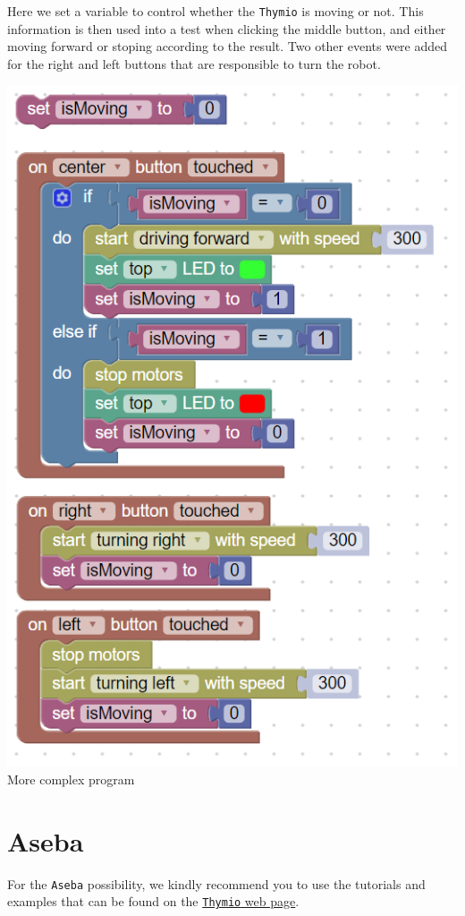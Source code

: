 \documentclass{scrreprt}
\begin{document}
Here we set a variable to control whether the \texttt{Thymio} is moving or not. This information is then used into a test when clicking the middle button, and either moving forward or stoping according to the result.
Two other events were added for the right and left buttons that are responsible to turn the robot.
\begin{center}
  \includegraphics[scale=0.5]{./Blockly/advanced_program}\\
  More complex program
\end{center}

\section{Aseba}

For the \texttt{Aseba} possibility, we kindly recommend you to use the tutorials and examples that can be found on the \href{https://www.thymio.org/program/aseba/}{\texttt{Thymio} web page}.
\end{document}
